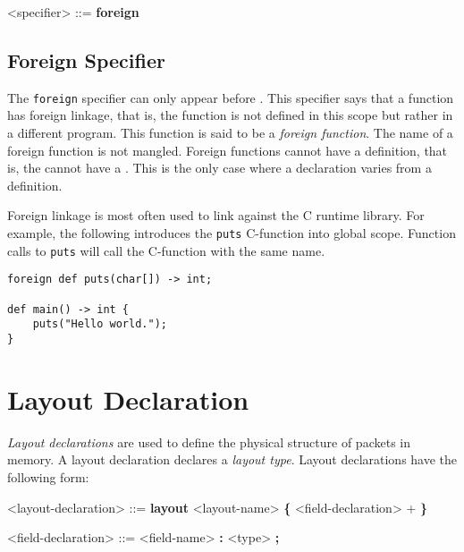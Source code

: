 \begin{grammar}
\singlespace
<specifier> ::= \textbf{foreign}
\end{grammar}

\subsection{Foreign Specifier} \label{foreign_spec}

The \texttt{foreign} specifier can only appear before . This specifier says that a function has foreign linkage, that is, the function is not defined in this scope but rather in a different program. This function is said to be a \textit{foreign function}. The name of a foreign function is not mangled. Foreign functions cannot have a definition, that is, the  cannot have a . This is the only case where a declaration varies from a definition.

Foreign linkage is most often used to link against the C runtime library. For example, the following introduces the \texttt{puts} C-function into global scope. Function calls to \texttt{puts} will call the C-function with the same name.

\begin{minip}
\begin{lstlisting}
foreign def puts(char[]) -> int;

def main() -> int {
	puts("Hello world.");
}
\end{lstlisting}
\end{minip}
 
\section{Layout Declaration} \label{layout_guide}

\textit{Layout declarations} are used to define the physical structure of packets in memory. A layout declaration declares a \textit{layout type}. Layout declarations have the following form:

\begin{minip}
\begin{grammar}
<layout-declaration> ::=
\textbf{layout} <layout-name>
\textbf{\{}
	<field-declaration> +
\textbf{\}}

<field-declaration> ::=
<field-name> \textbf{:} <type> \textbf{;}
\end{grammar}
\end{minip}

